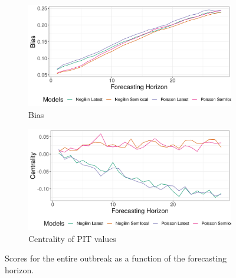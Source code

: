 \begin{figure}[H]
\begin{subfigure}{0.5\textwidth}
  \centering
  \includegraphics[width=\linewidth]{../output/Oicha_bias.png}  
  \caption{Bias}
  \label{fig:sub-third}
\end{subfigure}
\begin{subfigure}{0.5\textwidth}
  \centering
  \includegraphics[width=\linewidth]{../output/Oicha_centrality.png}  
  \caption{Centrality of PIT values}
  \label{fig:nat_scores_4}
\end{subfigure}
  \caption{Scores for the entire outbreak as a function of the forecasting horizon.}

  \label{fig:nat_scores}
\end{figure}

